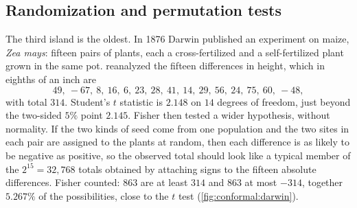 \begin{refsection}
\subsection{Randomization and permutation tests}\label{sec:conformal:fisher}

The third island is the oldest. In 1876 Darwin published an experiment on maize, \emph{Zea mays}: fifteen pairs of plants, each a cross-fertilized and a self-fertilized plant grown in the same pot. \textcite{Fisher1935} reanalyzed the fifteen differences in height, which in eighths of an inch are
\[
49,\ -67,\ 8,\ 16,\ 6,\ 23,\ 28,\ 41,\ 14,\ 29,\ 56,\ 24,\ 75,\ 60,\ -48,
\]
with total $314$. Student's $t$ statistic is $2.148$ on $14$ degrees of freedom, just beyond the two-sided $5\%$ point $2.145$. Fisher then tested a wider hypothesis, without normality. If the two kinds of seed come from one population and the two sites in each pair are assigned to the plants at random, then each difference is as likely to be negative as positive, so the observed total should look like a typical member of the $2^{15}=32{,}768$ totals obtained by attaching signs to the fifteen absolute differences. Fisher counted: $863$ are at least $314$ and $863$ at most $-314$, together $5.267\%$ of the possibilities, close to the $t$ test (\cref{fig:conformal:darwin}).


\end{refsection}
